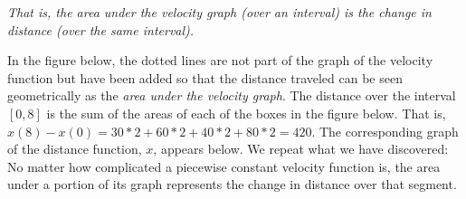 {\it That is, the area under the velocity graph (over an interval) is the change in distance (over the same interval).\/}

In the figure below, the dotted lines are not part of the graph of the 
velocity function but have been added so that the distance traveled can be 
seen geometrically as the {\it area under the velocity graph\/}. The distance 
over the interval $[0,8]$ is the sum of the areas of each of the boxes in 
the figure below. That is, 
$x(8) - x(0) = 30 * 2 + 60 * 2 + 40 * 2 + 80 * 2 = 420$.
The corresponding graph of the distance function, $x$, appears below.
We repeat what we have discovered:
No matter how complicated a piecewise constant velocity 
function is, the area under a portion of its graph represents  
the change in distance over that segment.

